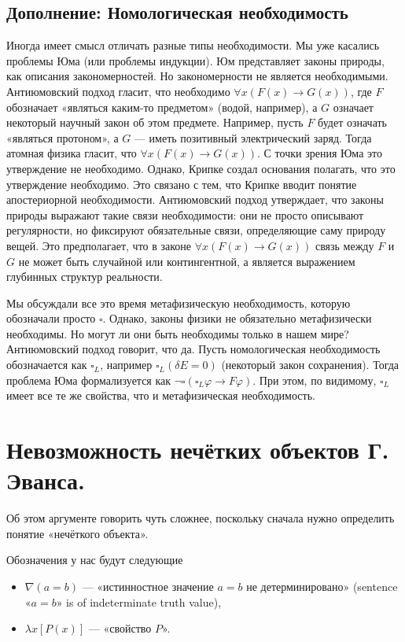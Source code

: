 \documentclass[openany]{book}
\theoremstyle{plain}
\theoremstyle{definition}
\begin{document}
\subsection{Дополнение: Номологическая необходимость}
Иногда имеет смысл отличать разные типы необходимости. Мы уже касались проблемы Юма (или проблемы индукции). Юм представляет законы природы, как описания закономерностей. Но закономерности не является необходимыми. Антиюмовский подход гласит, что необходимо \(\forall x (F(x) \to G(x))\), где \(F\) обозначает «являться каким-то предметом» (водой, например), а \(G\) означает некоторый научный закон об этом предмете. Например, пусть \(F\) будет означать «являться протоном», а \(G\) --- иметь позитивный электрический заряд. Тогда атомная физика гласит, что \(\forall x (F(x) \to G(x))\). С точки зрения Юма это утверждение не необходимо. Однако, Крипке создал основания полагать, что это утверждение необходимо. Это связано с тем, что Крипке вводит понятие апостериорной необходимости. Антиюмовский подход утверждает, что законы природы выражают такие связи необходимости: они не просто описывают регулярности, но фиксируют обязательные связи, определяющие саму природу вещей. Это предполагает, что в законе \( \forall x (F(x) \to G(x)) \) связь между \(F\) и \(G\) не может быть случайной или контингентной, а является выражением глубинных структур реальности.

Мы обсуждали все это время метафизическую необходимость, которую обозначали просто \(\square\). Однако, законы физики не обязательно метафизически необходимы. Но могут ли они быть необходимы только в нашем мире? Антиюмовский подход говорит, что да. Пусть номологическая необходимость обозначается как \(\square_L\), например \(\square_L(\delta E = 0)\) (некоторый закон сохранения). Тогда проблема Юма формализуется как \(\neg \square(\square_L \varphi \to F \varphi)\). При этом, по видимому, \(\square_L\) имеет все те же свойства, что и метафизическая необходимость.

\section{Невозможность нечётких объектов Г. Эванса.}

Об этом аргументе говорить чуть сложнее, поскольку сначала нужно определить понятие «нечёткого объекта».

Обозначения у нас будут следующие
\begin{itemize}
    \item \(\nabla (a = b)\) — «истинностное значение \(a = b\) не детерминировано» (sentence «\(a = b\)» is of indeterminate truth value),
    \item \(\lambda x [P(x)]\) — «свойство \(P\)».
\end{itemize}
\end{document}
